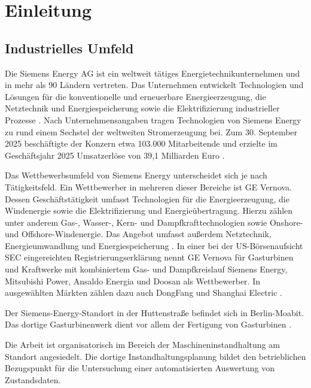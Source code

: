 \chapter{Einleitung}
\label{ch:einleitung}

\section{Industrielles Umfeld}
\label{sec:umfeld}


Die Siemens Energy AG ist ein weltweit tätiges Energietechnikunternehmen
und in mehr als 90 Ländern vertreten.
Das Unternehmen entwickelt Technologien und Lösungen für die konventionelle
und erneuerbare Energieerzeugung, die Netztechnik und Energiespeicherung
sowie die Elektrifizierung industrieller Prozesse
\cite{SiemensEnergy}.
Nach Unternehmensangaben tragen Technologien von Siemens Energy
zu rund einem Sechstel der weltweiten Stromerzeugung bei.
Zum 30. September 2025 beschäftigte der Konzern etwa 103.000 Mitarbeitende
und erzielte im Geschäftsjahr 2025 Umsatzerlöse von 39,1 Milliarden Euro
\cite[5]{se_presentation}.

Das Wettbewerbsumfeld von Siemens Energy unterscheidet sich je nach Tätigkeitsfeld.
Ein Wettbewerber in mehreren dieser Bereiche ist GE Vernova.
Dessen Geschäftstätigkeit umfasst Technologien für die Energieerzeugung,
die Windenergie sowie die Elektrifizierung und Energieübertragung.
Hierzu zählen unter anderem Gas-, Wasser-, Kern- und Dampfkrafttechnologien
sowie Onshore- und Offshore-Windenergie.
Das Angebot umfasst außerdem Netztechnik, Energieumwandlung und Energiespeicherung
\cite{MissionStatementGE}.
In einer bei der US-Börsenaufsicht SEC eingereichten Registrierungserklärung
nennt GE Vernova für Gasturbinen und Kraftwerke mit kombiniertem Gas- und Dampfkreislauf
Siemens Energy, Mitsubishi Power, Ansaldo Energia und Doosan als Wettbewerber.
In ausgewählten Märkten zählen dazu auch DongFang und Shanghai Electric \cite{S1}.


Der Siemens-Energy-Standort in der Huttenstraße befindet sich in Berlin-Moabit.
Das dortige Gasturbinenwerk dient vor allem der Fertigung von Gasturbinen
\cite{SiemensEnergySiedelt}.


Die Arbeit ist organisatorisch im Bereich der Maschineninstandhaltung am Standort angesiedelt.
Die dortige Instandhaltungsplanung bildet den betrieblichen Bezugspunkt
für die Untersuchung einer automatisierten Auswertung von Zustandsdaten.

